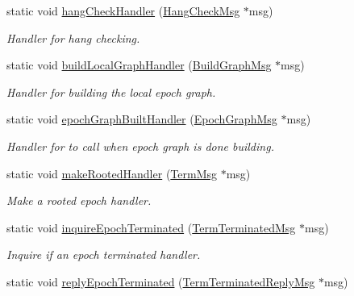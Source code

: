 \begin{DoxyCompactItemize}
\item 
static void \hyperlink{structvt_1_1term_1_1_termination_detector_af9fd292c8d1bcc5eba9ee1fb39c29ea2}{hang\+Check\+Handler} (\hyperlink{structvt_1_1term_1_1_hang_check_msg}{Hang\+Check\+Msg} $\ast$msg)
\begin{DoxyCompactList}\small\item\em Handler for hang checking. \end{DoxyCompactList}\item 
static void \hyperlink{structvt_1_1term_1_1_termination_detector_adb3b87cb03a5991e059bb7930ec5d682}{build\+Local\+Graph\+Handler} (\hyperlink{structvt_1_1term_1_1_build_graph_msg}{Build\+Graph\+Msg} $\ast$msg)
\begin{DoxyCompactList}\small\item\em Handler for building the local epoch graph. \end{DoxyCompactList}\item 
static void \hyperlink{structvt_1_1term_1_1_termination_detector_a5a8084f2dc7df36da7e78d088ae8cae9}{epoch\+Graph\+Built\+Handler} (\hyperlink{structvt_1_1term_1_1_termination_detector_aec8abc5a3b161ac7df73ff3ba385dace}{Epoch\+Graph\+Msg} $\ast$msg)
\begin{DoxyCompactList}\small\item\em Handler for to call when epoch graph is done building. \end{DoxyCompactList}\item 
static void \hyperlink{structvt_1_1term_1_1_termination_detector_a3290a7d57d60b0877a39379945303675}{make\+Rooted\+Handler} (\hyperlink{structvt_1_1term_1_1_term_msg}{Term\+Msg} $\ast$msg)
\begin{DoxyCompactList}\small\item\em Make a rooted epoch handler. \end{DoxyCompactList}\item 
static void \hyperlink{structvt_1_1term_1_1_termination_detector_a77d03435714d4abea092f464c42af1f0}{inquire\+Epoch\+Terminated} (\hyperlink{structvt_1_1term_1_1_term_terminated_msg}{Term\+Terminated\+Msg} $\ast$msg)
\begin{DoxyCompactList}\small\item\em Inquire if an epoch terminated handler. \end{DoxyCompactList}\item 
static void \hyperlink{structvt_1_1term_1_1_termination_detector_ad4e25e7f6a8703bdff30bc2f56ab195f}{reply\+Epoch\+Terminated} (\hyperlink{structvt_1_1term_1_1_term_terminated_reply_msg}{Term\+Terminated\+Reply\+Msg} $\ast$msg)

\end{DoxyCompactItemize}
